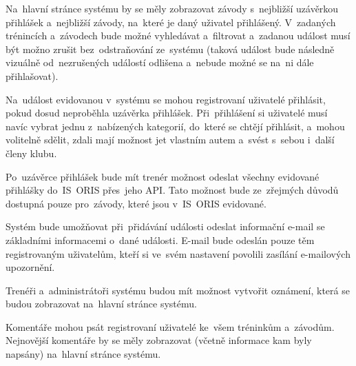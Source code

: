 \begin{enumerate}[label=\textcolor{decoration}{\textbf{F\arabic*}}]
	Na~hlavní stránce systému by se měly zobrazovat závody s~nejbližší uzávěrkou přihlášek a~nejbližší závody, na~které je daný uživatel přihlášený. V~zadaných trénincích a~závodech bude možné vyhledávat a~filtrovat a~zadanou událost musí být možno zrušit bez~odstraňování ze~systému (taková událost bude následně vizuálně od~nezrušených událostí odlišena a~nebude možné se na~ni dále přihlašovat).

	Na~událost evidovanou v~systému se mohou registrovaní uživatelé přihlásit, pokud dosud neproběhla uzávěrka přihlášek. Při~přihlášení si uživatelé musí navíc vybrat jednu z~nabízených kategorií, do~které se chtějí přihlásit, a~mohou volitelně sdělit, zdali mají možnost jet vlastním autem a~svést s~sebou i~další členy klubu.

	Po~uzávěrce přihlášek bude mít trenér možnost odeslat všechny evidované přihlášky do~IS~ORIS přes~jeho API. Tato možnost bude ze~zřejmých důvodů dostupná pouze pro~závody, které jsou v~IS~ORIS evidované.

	Systém bude umožňovat při~přidávání události odeslat informační e-mail se základními informacemi o~dané události. E-mail bude odeslán pouze těm registrovaným uživatelům, kteří si ve~svém nastavení povolili zasílání e-mailových upozornění.

	Trenéři a~administrátoři systému budou mít možnost vytvořit oznámení, která se budou zobrazovat na~hlavní stránce systému.

	Komentáře mohou psát registrovaní uživatelé ke~všem tréninkům a~závodům. Nejnovější komentáře by se měly zobrazovat (včetně informace kam byly napsány) na~hlavní stránce systému.
\end{enumerate}

